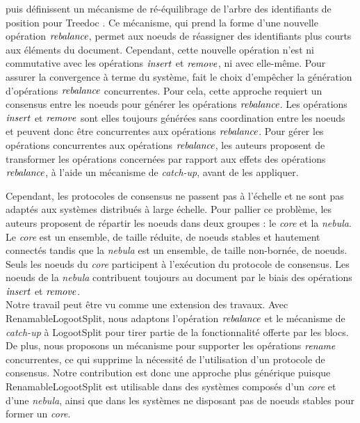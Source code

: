 \cite{letia:hal-01248270} puis \cite{zawirski:hal-01248197} définissent un mécanisme de ré-équilibrage de l'arbre des identifiants de position pour Treedoc \cite{2009-treedoc-preguica}.
Ce mécanisme, qui prend la forme d'une nouvelle opération $\mathit{rebalance}$, permet aux noeuds de réassigner des identifiants plus courts aux éléments du document.
Cependant, cette nouvelle opération n'est ni commutative avec les opérations $\mathit{insert}$ et $\mathit{remove}$, ni avec elle-même.
Pour assurer la convergence à terme \cite{10.1145/224057.224070} du système, \cite{zawirski:hal-01248197} fait le choix d'empêcher la génération d'opérations $\mathit{rebalance}$ concurrentes.
Pour cela, cette approche requiert un consensus entre les noeuds pour générer les opérations $\mathit{rebalance}$.
Les opérations $\mathit{insert}$ et $\mathit{remove}$ sont elles toujours générées sans coordination entre les noeuds et peuvent donc être concurrentes aux opérations $\mathit{rebalance}$.
Pour gérer les opérations concurrentes aux opérations $\mathit{rebalance}$, les auteurs proposent de transformer les opérations concernées par rapport aux effets des opérations$\mathit{rebalance}$, à l'aide un mécanisme de \emph{catch-up}, avant de les appliquer.

Cependant, les protocoles de consensus ne passent pas à l'échelle et ne sont pas adaptés aux systèmes distribués à large échelle.
Pour pallier ce problème, les auteurs proposent de répartir les noeuds dans deux groupes : le \emph{core} et la \emph{nebula}.
Le \emph{core} est un ensemble, de taille réduite, de noeuds stables et hautement connectés tandis que la \emph{nebula} est un ensemble, de taille non-bornée, de noeuds.
Seuls les noeuds du \emph{core} participent à l'exécution du protocole de consensus.
Les noeuds de la \emph{nebula} contribuent toujours au document par le biais des opérations $\mathit{insert}$ et $\mathit{remove}$.\\

Notre travail peut être vu comme une extension des travaux.
Avec RenamableLogootSplit, nous adaptons l'opération $\mathit{rebalance}$ et le mécanisme de \emph{catch-up} à LogootSplit pour tirer partie de la fonctionnalité offerte par les blocs.
De plus, nous proposons un mécanisme pour supporter les opérations $\mathit{rename}$ concurrentes, ce qui supprime la nécessité de l'utilisation d'un protocole de consensus.
Notre contribution est donc une approche plus générique puisque RenamableLogootSplit est utilisable dans des systèmes composés d'un \emph{core} et d'une \emph{nebula}, ainsi que dans les systèmes ne disposant pas de noeuds stables pour former un \emph{core}.

